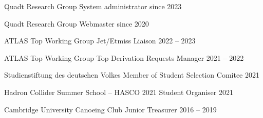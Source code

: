 \begin{cvhonors}
  \cvhonor
    {Quadt Research Group} %
    {System administrator} %
    {} %
    {since 2023} %

  \cvhonor
    {Quadt Research Group} %
    {Webmaster} %
    {} %
    {since 2020} %

  \cvhonor
    {ATLAS Top Working Group} %
    {Jet/Etmiss Liaison} %
    {} %
    {2022 -- 2023} %

  \cvhonor
    {ATLAS Top Working Group} %
    {Top Derivation Requests Manager} %
    {} %
    {2021 -- 2022} %

  \cvhonor
    {Studienstiftung des deutschen Volkes} %
    {Member of Student Selection Comitee} %
    {} %
    {2021} %

  \cvhonor
    {Hadron Collider Summer School -- HASCO 2021} %
    {Student Organiser} %
    {} %
    {2021} %

  \cvhonor
    {Cambridge University Canoeing Club} %
    {Junior Treasurer} %
    {} %
    {2016 -- 2019} %

\end{cvhonors}



\begin{cvpubs}



\end{cvpubs}


